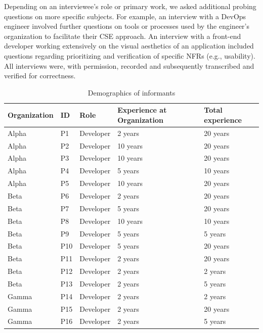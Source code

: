 \documentclass[smallextended]{svjour3}       %
\begin{document}
Depending on an interviewee's role or primary work, we asked additional probing questions on more specific subjects. 
For example, an interview with a DevOps engineer involved further questions on tools or processes used by the engineer's organization to facilitate their CSE approach. 
An interview with a front-end developer working extensively on the visual aesthetics of an application included questions regarding prioritizing and verification of specific NFRs (e.g., usability).
All interviews were, with permission, recorded and subsequently transcribed and verified for correctness.

\begin{table}[!h]
\footnotesize
    \centering
    \caption{Demographics of informants}
    \label{tab:informants}
    \begin{tabular}{p{1.5cm}p{0.6cm}p{2.5cm}p{3.5cm}p{2cm}}
\toprule
Organization & ID & Role & Experience at Organization & Total experience\\
\midrule 
Alpha & P1 & Developer & 2 years & 20 years\\
Alpha & P2 & Developer & 10 years & 20 years\\
Alpha & P3 & Developer & 10 years & 20 years\\
Alpha & P4 & Developer & 5 years & 10 years\\
Alpha & P5 & Developer & 10 years & 20 years\\
Beta & P6 & Developer & 2 years & 20 years\\
Beta  & P7 & Developer & 5 years & 20 years\\
Beta  & P8 & Developer & 10 years & 10 years\\
Beta & P9 & Developer & 5 years & 5 years\\
Beta & P10 & Developer & 5 years & 20 years\\
Beta & P11 & Developer & 2 years & 20 years\\
Beta & P12 & Developer & 2 years & 2 years\\
Beta & P13 & Developer & 2 years & 5 years\\
Gamma & P14 & Developer & 2 years & 2 years\\
Gamma & P15 & Developer & 2 years & 20 years\\
Gamma & P16 & Developer & 2 years & 5 years\\

\end{tabular}
\end{table}
\end{document}
